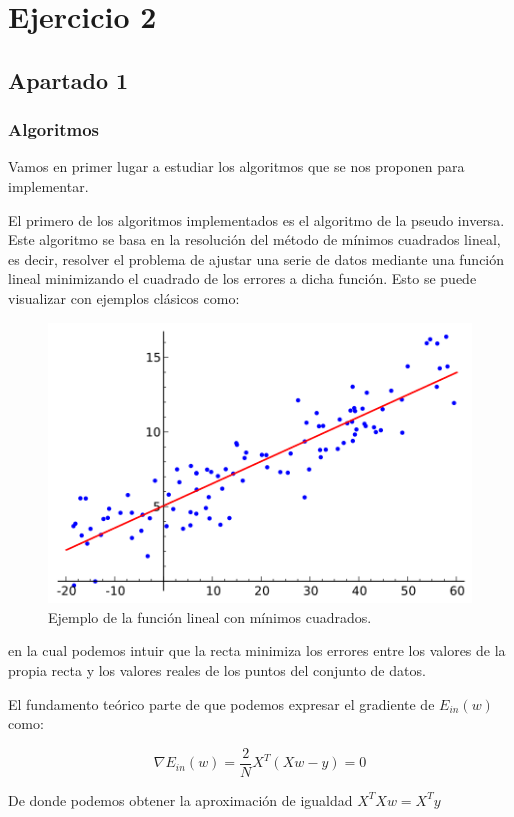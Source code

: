 \documentclass[12pt,a4paper]{article}
\begin{document}
\section{Ejercicio 2}
\subsection{Apartado 1}
\subsubsection{Algoritmos}
Vamos en primer lugar a estudiar los algoritmos que se nos proponen para implementar.

El primero de los algoritmos implementados es el algoritmo de la pseudo inversa. Este algoritmo se basa en la resolución del método de mínimos cuadrados lineal, es decir, resolver el problema de ajustar una serie de datos mediante una función lineal minimizando el cuadrado de los errores a dicha función. Esto se puede visualizar con ejemplos clásicos como:

\begin{figure}[H]
	\centering
	\includegraphics[scale=0.7]{./Imagenes/ej2-1.png}
	\caption{Ejemplo de la función lineal con mínimos cuadrados.}
	\label{ej2-1}
\end{figure}

en la cual podemos intuir que la recta minimiza los errores entre los valores de la propia recta y los valores reales de los puntos del conjunto de datos.

El fundamento teórico parte de que podemos expresar el gradiente de $E_{in}(w)$ como:

$$\nabla E_{in}(w) = \frac{2}{N}X^T (Xw - y) = 0$$

De donde podemos obtener la aproximación de igualdad $X^T X w = X^T y$
\end{document}
